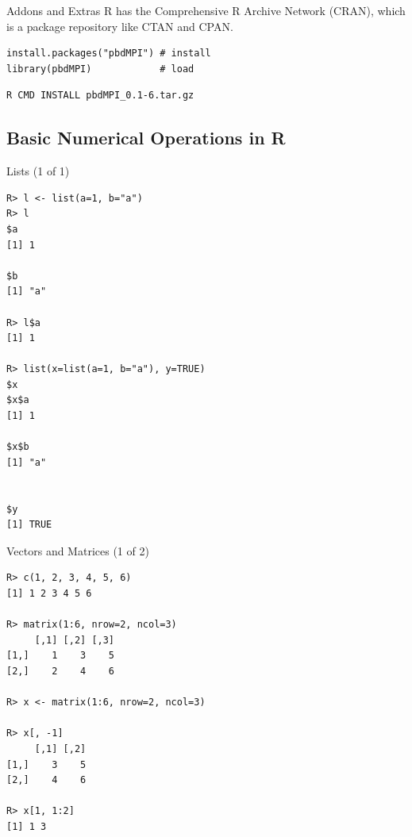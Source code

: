 \begin{frame}[fragile]
  \begin{block}{Addons and Extras}\pause
  R has the Comprehensive R Archive Network (CRAN), which is a package 
repository like CTAN and CPAN.
  \begin{lstlisting}[title=From R]
install.packages("pbdMPI") # install
library(pbdMPI)            # load
\end{lstlisting}

\begin{lstlisting}[title=From   
Shell,backgroundcolor=\color{white},basicstyle=\ttfamily\color{black}\scriptsize
,keywordstyle=\color{black}, 
  commentstyle=\color{black},stringstyle=\color{black}]
R CMD INSTALL pbdMPI_0.1-6.tar.gz
\end{lstlisting}
\end{block}
\end{frame}



\subsection{Basic Numerical Operations in R}

\begin{frame}
  \begin{exampleblock}{Lists (1 of 1)}\pause
  
\begin{lstlisting}[backgroundcolor=\color{white},basicstyle=\ttfamily\color{
dkgray}\scriptsize,keywordstyle=\color{black}, 
  commentstyle=\color{orange},stringstyle=\color{mauve}]
R> l <- list(a=1, b="a")
R> l
$a
[1] 1

$b
[1] "a"

R> l$a
[1] 1

R> list(x=list(a=1, b="a"), y=TRUE)
$x
$x$a
[1] 1

$x$b
[1] "a"


$y
[1] TRUE
\end{lstlisting}
  \end{exampleblock}
\end{frame}



\begin{frame}
  \begin{exampleblock}{Vectors and Matrices (1 of 2)}\pause
  
\begin{lstlisting}[backgroundcolor=\color{white},basicstyle=\ttfamily\color{
dkgray}\scriptsize,keywordstyle=\color{black}, 
  commentstyle=\color{orange},stringstyle=\color{mauve}]
R> c(1, 2, 3, 4, 5, 6)
[1] 1 2 3 4 5 6

R> matrix(1:6, nrow=2, ncol=3)
     [,1] [,2] [,3]
[1,]    1    3    5
[2,]    2    4    6

R> x <- matrix(1:6, nrow=2, ncol=3)

R> x[, -1]
     [,1] [,2]
[1,]    3    5
[2,]    4    6

R> x[1, 1:2]
[1] 1 3
\end{lstlisting}
  \end{exampleblock}
\end{frame}


